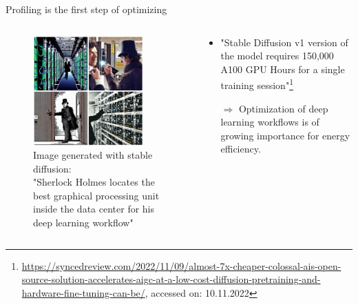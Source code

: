 \documentclass[compress,aspectratio=169]{beamer}
\begin{document}
\begin{frame}{Profiling is the first step of optimizing}

\begin{columns}
        \begin{column}{0.5\textwidth}
            \centering
            \vspace{-1em}
            \begin{figure}
            \includegraphics[width=0.85\textwidth]{assets/Sherlock-Holmes-locates-the-best-graphical-processing-unit-inside-the-data-center-for-his-deep-learning-workflow}
            \caption*{Image generated with stable diffusion: \\
            \tiny{"Sherlock Holmes locates the best graphical processing unit inside the data center for his deep learning workflow"}}
            \end{figure}
        \end{column}
        \begin{column}{0.5\textwidth}
            \begin{itemize}
                \item "Stable Diffusion v1 version of the model requires 150,000 A100 GPU Hours for a single training session"\footnote{\tiny{\url{https://syncedreview.com/2022/11/09/almost-7x-cheaper-colossal-ais-open-source-solution-accelerates-aigc-at-a-low-cost-diffusion-pretraining-and-hardware-fine-tuning-can-be/}}, accessed on: 10.11.2022}
                \vspace{1em}
                \item[$\Rightarrow$] Optimization of deep learning workflows is of growing importance for energy efficiency.
            \end{itemize}
        \end{column}
    \end{columns}

\end{frame}
\end{document}
